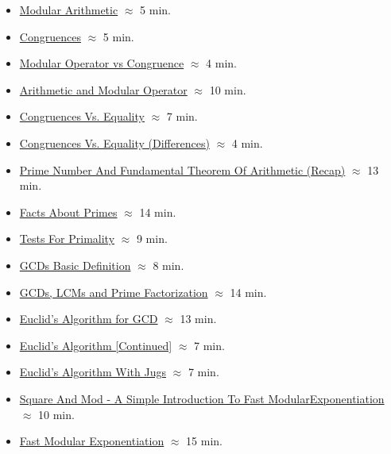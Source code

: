 \begin{itemize}
    \item \href{https://applied.cs.colorado.edu/mod/hvp/view.php?id=51691}{Modular Arithmetic} $\approx$ 5 min.
    \item \href{https://applied.cs.colorado.edu/mod/hvp/view.php?id=51692}{Congruences} $\approx$ 5 min.
    \item \href{https://applied.cs.colorado.edu/mod/hvp/view.php?id=51693}{Modular Operator vs Congruence} $\approx$ 4 min.
    \item \href{https://applied.cs.colorado.edu/mod/hvp/view.php?id=51694}{Arithmetic and Modular Operator} $\approx$ 10 min.
    \item \href{https://applied.cs.colorado.edu/mod/hvp/view.php?id=51695}{Congruences Vs. Equality} $\approx$ 7 min.
    \item \href{https://applied.cs.colorado.edu/mod/hvp/view.php?id=51696}{Congruences Vs. Equality (Differences)} $\approx$ 4 min.
    \item \href{https://applied.cs.colorado.edu/mod/hvp/view.php?id=51697}{Prime Number And Fundamental Theorem Of Arithmetic (Recap)} $\approx$ 13 min.
    \item \href{https://applied.cs.colorado.edu/mod/hvp/view.php?id=51698}{Facts About Primes} $\approx$ 14 min.
    \item \href{https://applied.cs.colorado.edu/mod/hvp/view.php?id=51699}{Tests For Primality} $\approx$ 9 min.
    \item \href{https://applied.cs.colorado.edu/mod/hvp/view.php?id=51700}{GCDs Basic Definition} $\approx$ 8 min.
    \item \href{https://applied.cs.colorado.edu/mod/hvp/view.php?id=51701}{GCDs, LCMs and Prime Factorization} $\approx$ 14 min.
    \item \href{https://applied.cs.colorado.edu/mod/hvp/view.php?id=51702}{Euclid's Algorithm for GCD} $\approx$ 13 min.
    \item \href{https://applied.cs.colorado.edu/mod/hvp/view.php?id=51703}{Euclid's Algorithm [Continued]} $\approx$ 7 min.
    \item \href{https://applied.cs.colorado.edu/mod/hvp/view.php?id=51704}{Euclid's Algorithm With Jugs} $\approx$ 7 min.
    \item \href{https://o365coloradoedu-my.sharepoint.com/personal/stadee_colorado_edu/_layouts/15/stream.aspx?id=%2Fpersonal%2Fstadee%5Fcolorado%5Fedu%2FDocuments%2FG%2FAAAPostbac%2FDiscrete%20Structures%2Fweek6%5F7%20%2D%20number%20theory%5Fmod%2FFMEorSquareandMod%2Emp4&ga=1}{Square And Mod - A Simple Introduction To Fast ModularExponentiation} $\approx$ 10 min.
    \item \href{https://applied.cs.colorado.edu/mod/hvp/view.php?id=51706}{Fast Modular Exponentiation} $\approx$ 15 min.
\end{itemize}

